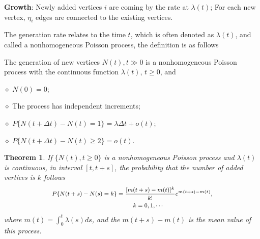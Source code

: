 \documentclass[final]{IEEEtran}
\newtheorem{theorem}{Theorem}
\begin{document}
\textbf{Growth}: Newly added vertices $i$ are coming by the rate
at $\lambda(t)$; For each new vertex, $\eta_{i}$ edges are
connected to the existing vertices.



%

The generation rate relates to the time $t$, which is often
denoted as $\lambda (t)$, and called a nonhomogeneous Poisson
process, the definition is as follows
\begin{myDef}\label{d7}
 The generation of new vertices ${N(t), t\gg0}$
is a nonhomogeneous Poisson process with the continuous function
$\lambda (t)$, $t\geq0$, and

\noindent$\diamond$ $N(0)=0$;

\noindent$\diamond$ The process has independent increments;

\noindent$\diamond$ $P\{N(t+\Delta t)-N(t)=1\}=\lambda\Delta
t+o(t)$;

\noindent$\diamond$ $P\{N(t+\Delta t)-N(t)\geq 2\}=o(t)$.

\end{myDef}


\begin{theorem}\label{t2}
If $\{N(t), t\geq 0\}$ is a nonhomogeneous Poisson process and
$\lambda(t)$ is continuous, in interval $[t, t+s]$, the
probability that the number of added vertices is $k$ follows
\begin{equation}\footnotesize
\begin{aligned}
&P\{N(t+s)-N(s)=k\}=\frac{[m(t+s)-m(t)]^{k}}{k!}e^{m(t+s)-m(t)},\\
&\hspace{4cm} k=0,1,\cdots
\end{aligned}
\end{equation}
where $m(t)$$=$$\int_{0}^{t}\lambda(s)ds$, and the $m(t+s)-m(t)$
is the mean value of this process.
\end{theorem}

\end{document}
